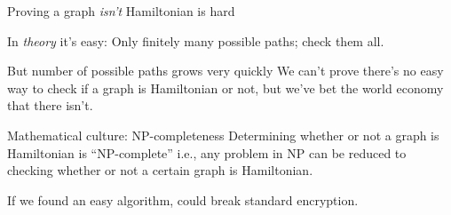 \documentclass{beamer}
\begin{document}
\begin{frame}{Proving a graph \emph{isn't} Hamiltonian is hard}
  \begin{block}{In \emph{theory} it's easy:}
    Only finitely many possible paths; check them all.
  \end{block}
  \begin{block}{But number of possible paths grows very quickly}
We can't prove there's no easy way to check if a graph is Hamiltonian or not, but we've bet the world economy that there isn't.
  \end{block}
  
\begin{block}{Mathematical culture: NP-completeness}
  Determining whether or not a graph is Hamiltonian is ``NP-complete'' i.e., any problem in NP can be reduced to checking whether or not a certain graph is Hamiltonian. 
\end{block}
If we found an easy algorithm, could break standard encryption.
  \end{frame}


\end{document}
